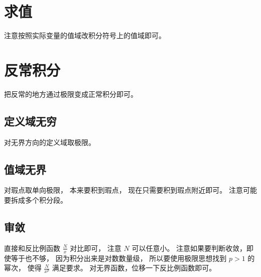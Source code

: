 \documentclass[UTF8,a4paper,11pt]{ctexart}
\begin{document}
  \section{求值}
    注意按照实际变量的值域改积分符号上的值域即可。
  \section{反常积分}
    把反常的地方通过极限变成正常积分即可。
    \subsection{定义域无穷}
      对无界方向的定义域取极限。
    \subsection{值域无界}
      对瑕点取单向极限，
      本来要积到瑕点，
      现在只需要积到瑕点附近即可。
      注意可能要拆成多个积分段。
    \subsection{审敛}
      直接和反比例函数 $\frac{N}{x}$ 对比即可，
      注意 $N$ 可以任意小。
      注意如果要判断收敛，即使等于也不够，
      因为积分出来是对数数量级，
      所以要使用极限思想找到 $p > 1$ 的幂次，
      使得 $\frac{N}{x^{p}}$ 满足要求。
      对无界函数，位移一下反比例函数即可。
      
\end{document}
